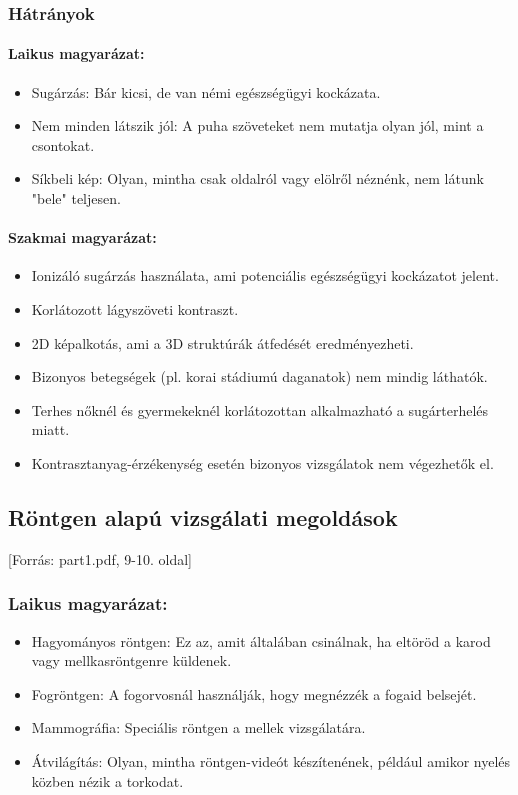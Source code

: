 \documentclass[a4paper,12pt]{article}
\begin{document}
\subsubsection{Hátrányok}

\paragraph{Laikus magyarázat:} \begin{itemize} \item Sugárzás: Bár kicsi, de van némi egészségügyi kockázata. \item Nem minden látszik jól: A puha szöveteket nem mutatja olyan jól, mint a csontokat. \item Síkbeli kép: Olyan, mintha csak oldalról vagy elölről néznénk, nem látunk "bele" teljesen. \end{itemize}

\paragraph{Szakmai magyarázat:} \begin{itemize} \item Ionizáló sugárzás használata, ami potenciális egészségügyi kockázatot jelent. \item Korlátozott lágyszöveti kontraszt. \item 2D képalkotás, ami a 3D struktúrák átfedését eredményezheti. \item Bizonyos betegségek (pl. korai stádiumú daganatok) nem mindig láthatók. \item Terhes nőknél és gyermekeknél korlátozottan alkalmazható a sugárterhelés miatt. \item Kontrasztanyag-érzékenység esetén bizonyos vizsgálatok nem végezhetők el. \end{itemize}

\subsection{Röntgen alapú vizsgálati megoldások} [Forrás: part1.pdf, 9-10. oldal]

\subsubsection{Laikus magyarázat:} \begin{itemize} \item Hagyományos röntgen: Ez az, amit általában csinálnak, ha eltöröd a karod vagy mellkasröntgenre küldenek. \item Fogröntgen: A fogorvosnál használják, hogy megnézzék a fogaid belsejét. \item Mammográfia: Speciális röntgen a mellek vizsgálatára. \item Átvilágítás: Olyan, mintha röntgen-videót készítenének, például amikor nyelés közben nézik a torkodat. \end{itemize}
\end{document}
